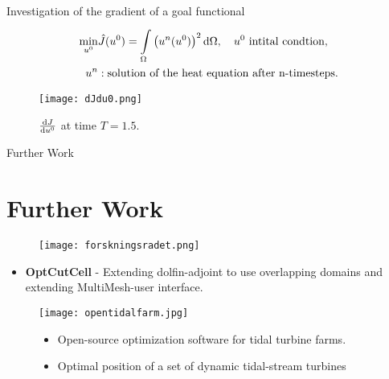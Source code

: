 \documentclass[mathserif]{beamer}
\begin{document}
\begin{frame}{Investigation of the gradient of a goal functional}
  \begin{align*}
    \min_{u^0}&\hat{J}(u^0)=\int\limits_{ \Omega}^{}\left(u^n(u^0)\right)^2\mathrm{d}\Omega,
    \quad  u^0\text{ intital condtion,}\\
    u^n&:\text{solution of the heat equation after n-timesteps.}
  \end{align*}
  \begin{figure}
    \texttt{[image: dJdu0.png]}
    \caption{$\frac{\mathrm{d}J}{\mathrm{d} u^0}$ at time $T=1.5$. }
  \end{figure}
\end{frame}


\begin{frame}{Further Work\section{Further Work}}
  \begin{figure}
    \texttt{[image: forskningsradet.png]}
  \end{figure}
  \begin{itemize}
  \item \textbf{OptCutCell} - Extending dolfin-adjoint to use overlapping
    domains and extending MultiMesh-user interface.
  \end{itemize}
  \begin{figure}
    \texttt{[image: opentidalfarm.jpg]}
    \begin{itemize}
    \item Open-source optimization software for tidal turbine farms.
    \item Optimal position of a set of dynamic tidal-stream turbines
    \end{itemize}
  \end{figure}
\end{frame}
\end{document}
